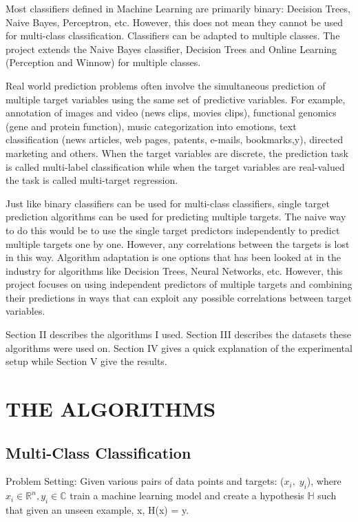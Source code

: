 \documentclass[letterpaper, 11 pt, conference]{IEEEtran}  %
\begin{document}
Most classifiers defined in Machine Learning are primarily binary: Decision Trees, Naive Bayes, Perceptron, etc. However, this does not mean they cannot be used for multi-class classification. Classifiers can be adapted to multiple classes. The project extends the Naive Bayes classifier, Decision Trees and Online Learning (Perception and Winnow) for multiple classes.

Real world prediction problems often involve the simultaneous prediction of multiple target variables using the same set of predictive variables. For example, annotation of images and video (news clips, movies clips), functional genomics (gene and protein function), music categorization into emotions, text classification (news articles, web pages, patents, e-mails, bookmarks,y), directed marketing and others. When the target variables are discrete, the prediction task is called multi-label classification while when the target variables are real-valued the task is called multi-target regression.

Just like binary classifiers can be used for multi-class classifiers, single target prediction algorithms can be used for predicting multiple targets. The naive way to do this would be to use the single target predictors independently to predict multiple targets one by one. However, any correlations between the targets is lost in this way. Algorithm adaptation is one options that has been looked at in the industry for algorithms like Decision Trees, Neural Networks, etc. However, this project focuses on using independent predictors of multiple targets and combining their predictions in ways that can exploit any possible correlations between target variables.

Section II describes the algorithms I used. Section III describes the datasets these algorithms were used on. Section IV gives a quick explanation of the experimental setup while Section V give the results.

\section{THE ALGORITHMS}

\subsection{\textbf{Multi-Class Classification}}

Problem Setting: Given various pairs of data points and targets: ($x_i,\;y_i$), where $x_i \in \mathbb{R}^n, y_i \in \mathbb{C}$ train a machine learning model and create a hypothesis $\mathbb{H}$ such that given an unseen example, x, H(x) = y.
\end{document}
